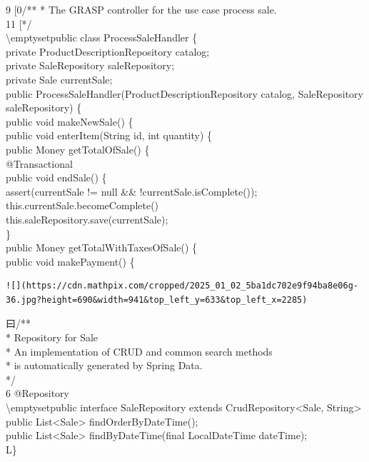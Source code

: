 \documentclass[10pt]{article}
\begin{document}
9 [0/** * The GRASP controller for the use case process sale.\\
11 [*/\\
\textbackslash emptysetpublic class ProcessSaleHandler \{\\
private ProductDescriptionRepository catalog;\\
private SaleRepository saleRepository;\\
private Sale currentSale;\\
public ProcessSaleHandler(ProductDescriptionRepository catalog, SaleRepository saleRepository) \{\\
public void makeNewSale() \{\\
public void enterItem(String id, int quantity) \{\\
public Money getTotalOfSale() \{\\
@Transactional\\
public void endSale() \{\\
assert(currentSale != null \&\& !currentSale.isComplete());\\
this.currentSale.becomeComplete()\\
this.saleRepository.save(currentSale);\\
\}\\
public Money getTotalWithTaxesOfSale() \{\\
public void makePayment() \{

\begin{verbatim}
![](https://cdn.mathpix.com/cropped/2025_01_02_5ba1dc702e9f94ba8e06g-36.jpg?height=690&width=941&top_left_y=633&top_left_x=2285)
\end{verbatim}

曰/**\\
* Repository for Sale\\
* An implementation of CRUD and common search methods\\
* is automatically generated by Spring Data.\\
*/\\
6 @Repository\\
\textbackslash emptysetpublic interface SaleRepository extends CrudRepository<Sale, String>\\
public List<Sale> findOrderByDateTime();\\
public List<Sale> findByDateTime(final LocalDateTime dateTime);\\
L\}
\end{document}
